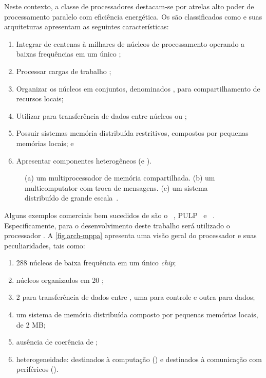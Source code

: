 Neste contexto, a classe de processadores \lws destacam-se por atrelas alto poder de processamento paralelo com eficiência energética. Os \lws são classificados como \mpsoc e suas arquiteturas apresentam as seguintes características:
\begin{enumerate}[label=(\roman*)]
    \item Integrar de centenas à milhares de núcleos de processamento operando a baixas frequências em um único \chip;
    \item Processar cargas de trabalho \mimd;
    \item Organizar os núcleos em conjuntos, denominados \clusters, para compartilhamento de recursos locais;
    \item Utilizar \nocs para transferência de dados entre núcleos ou \clusters;
    \item Possuir sistemas memória distribuída restritivos, compostos por pequenas memórias locais; e
    \item Apresentar componentes heterogêneos (\cclusters e \ioclusters).
\end{enumerate}

\begin{figure}[t]
    \centering
    
    \caption{(a) um multiprocessador de memória compartilhada. (b) um multicomputator com troca de mensagens. (c) um sistema distribuído de grande escala~\cite{tanenbaum:4ed}.}
    \label{fig.mimd}
\end{figure}

Alguns exemplos comerciais bem sucedidos de \lws são o \mppa~\cite{dinechin:2013}, PULP~\cite{pulp} e \taihulight~\cite{fu2016sunway}.
%
Especificamente, para o desenvolvimento deste trabalho será utilizado o processador \mppa. A \autoref{fig.arch-mppa} apresenta uma visão geral do processador e suas peculiaridades, tais como:

\begin{enumerate}[label=(\roman*)]
    \item 288 núcleos de baixa frequência em um único \textit{chip};
    \item núcleos organizados em 20 \clusters;
    \item 2 \nocs para transferência de dados entre \clusters, uma para controle e outra para dados;
    \item um sistema de memória distribuída composto por pequenas memórias locais, \eg \sram de 2 MB;
    \item ausência de coerência de \cache;
    \item heterogeneidade: \clusters destinados à computação (\cclusters) e \clusters destinados à comunicação com periféricos (\ioclusters).
\end{enumerate}

